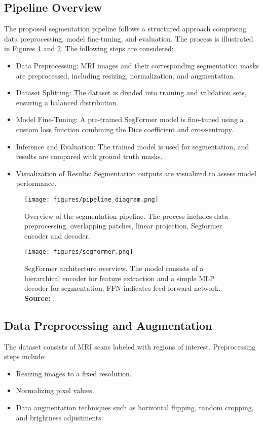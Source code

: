 \documentclass[journal]{IEEEtran}
\begin{document}
\subsection{Pipeline Overview}

The proposed segmentation pipeline follows a structured approach comprising data preprocessing, model fine-tuning, and evaluation. The process is illustrated in Figures \ref{fig:pipeline} and \ref{fig:segformer}. The following steps are considered:
\begin{itemize}
\item Data Preprocessing: MRI images and their corresponding segmentation masks are preprocessed, including resizing, normalization, and augmentation.
\item Dataset Splitting: The dataset is divided into training and validation sets, ensuring a balanced distribution.
\item Model Fine-Tuning: A pre-trained SegFormer model is fine-tuned using a custom loss function combining the Dice coefficient and cross-entropy.
\item Inference and Evaluation: The trained model is used for segmentation, and results are compared with ground truth masks.
\item Visualization of Results: Segmentation outputs are visualized to assess model performance.
\end{itemize}
\begin{figure}[h]
\centering
\texttt{[image: figures/pipeline\_diagram.png]}
\caption{Overview of the segmentation pipeline. The process includes data preprocessing, overlapping patches, linear projection, Segformer encoder and decoder.}
\label{fig:pipeline}
\end{figure}

\begin{figure}[h]
  \centering
  \texttt{[image: figures/segformer.png]}
  \caption{SegFormer architecture overview. The model consists of a hierarchical encoder for feature extraction and a simple MLP decoder for segmentation. FFN indicates feed-forward network. \textbf{Source:} \cite{xie2021segformer}.}
  \label{fig:segformer}
  \end{figure}

\subsection{Data Preprocessing and Augmentation}

The dataset consists of MRI scans labeled with regions of interest. Preprocessing steps include:
\begin{itemize}
\item Resizing images to a fixed resolution.
\item Normalizing pixel values.
\item Data augmentation techniques such as horizontal flipping, random cropping, and brightness adjustments.
\end{itemize}
\end{document}
